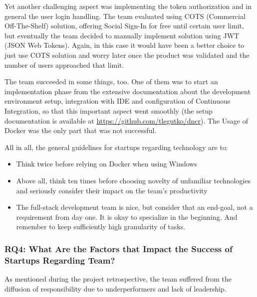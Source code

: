 \documentclass{article}
\begin{document}
Yet another challenging aspect was implementing the token authorization and in general the user login handling. The team evaluated using COTS (Commercial Off-The-Shelf) solution, offering Social Sign-In for free until certain user limit, but eventually the team decided to manually implement solution using JWT (JSON Web Tokens). Again, in this case it would have been a better choice to just use COTS solution and worry later once the product was validated and the number of users approached that limit.

The team succeeded in some things, too. One of them was to start an implementation phase from the extensive documentation about the development environment setup, integration with IDE and configuration of Continuous Integration, so that this important aspect went smoothly (the setup documentation is available at \url{https://github.com/tlegutko/dncr}). The Usage of Docker was the only part that was not successful.

All in all, the general guidelines for startups regarding technology are to:
\begin{itemize}
\item Think twice before relying on Docker when using Windows
\item Above all, think ten times before choosing novelty of unfamiliar technologies and seriously consider their impact on the team's productivity
\item The full-stack development team is nice, but consider that an end-goal, not a requirement from day one. It is okay to specialize in the beginning. And remember to keep sufficiently high granularity of tasks.
\end{itemize}

\subsubsection{RQ4: What Are the Factors that Impact the Success of Startups Regarding Team?}
As mentioned during the project retrospective, the team suffered from the diffusion of responsibility due to underperformers and lack of leadership.
\end{document}
